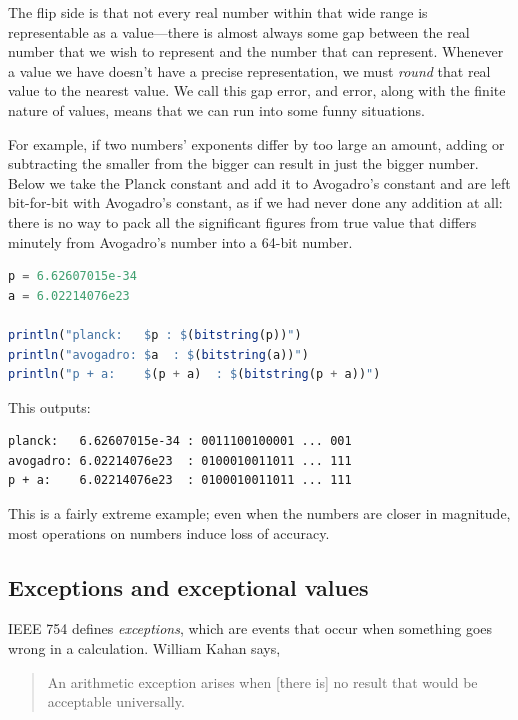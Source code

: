 \documentclass{juliacon}
\begin{document}
The flip side is that not every real number within that wide range is representable as a \fp{} value---there is almost always some gap between the real number that we wish to represent and the \fp{} number that can represent.
Whenever a value we have doesn't have a precise representation, we must \emph{round} that real value to the nearest \fp{} value.
We call this gap error, and error, along with the finite nature of \fp{} values, means that we can run into some funny situations.

For example, if two numbers' exponents differ by too large an amount, adding or subtracting the smaller from the bigger can result in just the bigger number.
Below we take the Planck constant and add it to Avogadro's constant and are left bit-for-bit with Avogadro's constant, as if we had never done any addition at all: there is no way to pack all the significant figures from true value that differs minutely from Avogadro's number into a 64-bit \fp{} number.

\begin{lstlisting}[language = Julia]
p = 6.62607015e-34
a = 6.02214076e23

println("planck:   $p : $(bitstring(p))")
println("avogadro: $a  : $(bitstring(a))")
println("p + a:    $(p + a)  : $(bitstring(p + a))")
\end{lstlisting}

This outputs:

\begin{lstlisting}
planck:   6.62607015e-34 : 0011100100001 ... 001
avogadro: 6.02214076e23  : 0100010011011 ... 111
p + a:    6.02214076e23  : 0100010011011 ... 111
\end{lstlisting}

This is a fairly extreme example; even when the numbers are closer in magnitude, most operations on \fp{} numbers induce loss of accuracy.

\subsection{Exceptions and exceptional values}

IEEE 754 defines \emph{\fp{} exceptions}, which are events that occur when something goes wrong in a calculation.
William Kahan says,

\begin{quote}
An arithmetic exception arises when [there is] no result that would be acceptable universally.
\end{quote}
\end{document}
